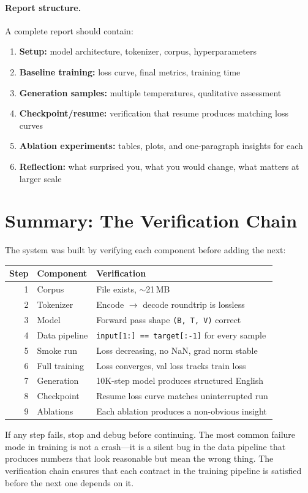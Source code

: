 \paragraph{Report structure.}

A complete report should contain:
\begin{enumerate}[nosep]
  \item \textbf{Setup:} model architecture, tokenizer, corpus, hyperparameters
  \item \textbf{Baseline training:} loss curve, final metrics, training time
  \item \textbf{Generation samples:} multiple temperatures, qualitative assessment
  \item \textbf{Checkpoint/resume:} verification that resume produces matching loss curves
  \item \textbf{Ablation experiments:} tables, plots, and one-paragraph insights for each
  \item \textbf{Reflection:} what surprised you, what you would change, what matters at larger scale
\end{enumerate}


\section{Summary: The Verification Chain}
\label{sec:guide-summary}

The system was built by verifying each component before adding the next:

\begin{center}
\begin{tabular}{rll}
\toprule
Step & Component & Verification \\
\midrule
1 & Corpus & File exists, $\sim$21\,MB \\
2 & Tokenizer & Encode $\to$ decode roundtrip is lossless \\
3 & Model & Forward pass shape \texttt{(B, T, V)} correct \\
4 & Data pipeline & \texttt{input[1:] == target[:-1]} for every sample \\
5 & Smoke run & Loss decreasing, no NaN, grad norm stable \\
6 & Full training & Loss converges, val loss tracks train loss \\
7 & Generation & 10K-step model produces structured English \\
8 & Checkpoint & Resume loss curve matches uninterrupted run \\
9 & Ablations & Each ablation produces a non-obvious insight \\
\bottomrule
\end{tabular}
\end{center}

If any step fails, stop and debug before continuing.
The most common failure mode in training is not a crash---it is a silent bug in the data pipeline that produces numbers that look reasonable but mean the wrong thing.
The verification chain ensures that each contract in the training pipeline is satisfied before the next one depends on it.
